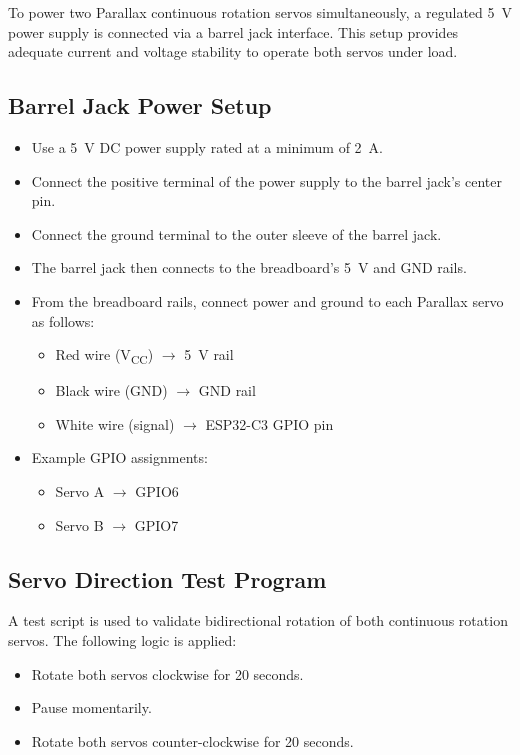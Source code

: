 \documentclass[conference]{IEEEtran}
\begin{document}
To power two Parallax continuous rotation servos simultaneously, a regulated 5~V power supply is connected via a barrel jack interface. This setup provides adequate current and voltage stability to operate both servos under load.

\subsection{Barrel Jack Power Setup}

\begin{itemize}
    \item Use a 5~V DC power supply rated at a minimum of 2~A.
    \item Connect the positive terminal of the power supply to the barrel jack's center pin.
    \item Connect the ground terminal to the outer sleeve of the barrel jack.
    \item The barrel jack then connects to the breadboard's 5~V and GND rails.
    \item From the breadboard rails, connect power and ground to each Parallax servo as follows:
    \begin{itemize}
        \item Red wire (V\textsubscript{CC}) $\rightarrow$ 5~V rail
        \item Black wire (GND) $\rightarrow$ GND rail
        \item White wire (signal) $\rightarrow$ ESP32-C3 GPIO pin
    \end{itemize}
    \item Example GPIO assignments:
    \begin{itemize}
        \item Servo A $\rightarrow$ GPIO6
        \item Servo B $\rightarrow$ GPIO7
    \end{itemize}
\end{itemize}

\subsection{Servo Direction Test Program}

A test script is used to validate bidirectional rotation of both continuous rotation servos. The following logic is applied:

\begin{itemize}
    \item Rotate both servos clockwise for 20 seconds.
    \item Pause momentarily.
    \item Rotate both servos counter-clockwise for 20 seconds.
\end{itemize}
\end{document}
